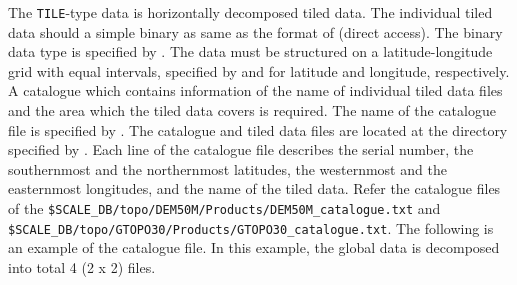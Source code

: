The \verb|TILE|-type data is horizontally decomposed tiled data.
The individual tiled data should a simple binary as same as the format of \grads (direct access).
The binary data type is specified by .
The data must be structured on a latitude-longitude grid with equal intervals, specified by  and  for latitude and longitude, respectively.
A catalogue which contains information of the name of individual tiled data files and the area which the tiled data covers is required.
The name of the catalogue file is specified by .
The catalogue and tiled data files are located at the directory specified by .
Each line of the catalogue file describes the serial number, the southernmost and the northernmost latitudes, the westernmost and the easternmost longitudes, and the name of the tiled data.
Refer the catalogue files of the \verb|$SCALE_DB/topo/DEM50M/Products/DEM50M_catalogue.txt| and \\
\verb|$SCALE_DB/topo/GTOPO30/Products/GTOPO30_catalogue.txt|.
The following is an example of the catalogue file.
In this example, the global data is decomposed into total 4 (2 x 2) files.
